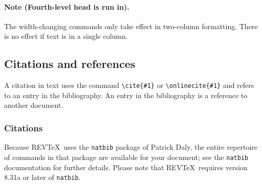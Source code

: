 \documentclass[%
 preprint, linenumbers,
 amsmath,amssymb,
 aps, physrev,
]{revtex4-2}
\begin{document}
\paragraph{Note (Fourth-level head is run in).}
The width-changing commands only take effect in two-column formatting. 
There is no effect if text is in a single column.

\subsection{\label{sec:citeref}Citations and references}
A citation in text uses the command \verb+\cite{#1}+ or
\verb+\onlinecite{#1}+ and refers to an entry in the bibliography. 
An entry in the bibliography is a reference to another document.

\subsubsection{Citations}
Because REV\TeX\ uses the \verb+natbib+ package of Patrick Daly, 
the entire repertoire of commands in that package are available for your document;
see the \verb+natbib+ documentation for further details. Please note that
REV\TeX\ requires version 8.31a or later of \verb+natbib+.
\end{document}
